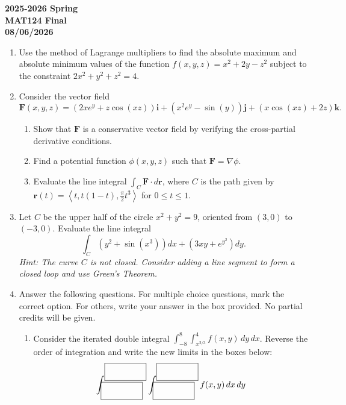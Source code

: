 \documentclass[a4paper, 12pt]{article}
\begin{document}
\pagestyle{empty}

\begin{center}
\textbf{2025-2026 Spring \\MAT124 Final\\08/06/2026}
\end{center}

\begin{enumerate}[leftmargin=*,label=\textbf{\arabic*.}]
\item Use the method of Lagrange multipliers to find the absolute maximum and absolute minimum values of the function $f(x, y, z) = x^2 + 2y - z^2$ subject to the constraint $2x^2 + y^2 + z^2 = 4$.

\item Consider the vector field
\[\mathbf{F}(x, y, z) = (2xe^y + z \cos(xz))\mathbf{i} + (x^2 e^y - \sin(y))\mathbf{j} + (x \cos(xz) + 2z)\mathbf{k}.\]
\begin{enumerate}[leftmargin=*,label=\textbf{\alph*.}]
\item Show that $\mathbf{F}$ is a conservative vector field by verifying the cross-partial derivative conditions.
\item Find a potential function $\phi(x, y, z)$ such that $\mathbf{F} = \nabla\phi$.
\item Evaluate the line integral $\int_C \mathbf{F} \cdot d\mathbf{r}$, where $C$ is the path given by \linebreak $\mathbf{r}(t) = \left\langle t, t(1-t), \frac{\pi}{2}t^3 \right\rangle$ for $0 \le t \le 1$.
\end{enumerate}

\item Let $C$ be the upper half of the circle $x^2 + y^2 = 9$, oriented from $(3, 0)$ to $(-3, 0)$. Evaluate the line integral
\[\int_C \left(y^2 + \sin(x^3)\right) dx + \left(3xy + e^{y^2}\right) dy.\]
\textit{Hint: The curve $C$ is not closed. Consider adding a line segment to form a closed loop and use Green's Theorem.}

\item Answer the following questions. For multiple choice questions, mark the correct option. For others, write your answer in the box provided. No partial credits will be given.

\begin{enumerate}[leftmargin=*, label=\textbf{\arabic{enumi}.\arabic*.}]
\item Consider the iterated double integral $\int_{-8}^8 \int_{x^{2/3}}^4 f(x, y)\,dy\,dx$. Reverse the order of integration and write the new limits in the boxes below:
\[\int_{\boxed{\phantom{\rule{1.5cm}{0.5cm}}}}^{\boxed{\phantom{\rule{1.5cm}{0.5cm}}}} \int_{\boxed{\phantom{\rule{1.5cm}{0.5cm}}}}^{\boxed{\phantom{\rule{1.5cm}{0.5cm}}}} f(x,y)\,dx\,dy\]


\end{enumerate}
\end{enumerate}
\end{document}
